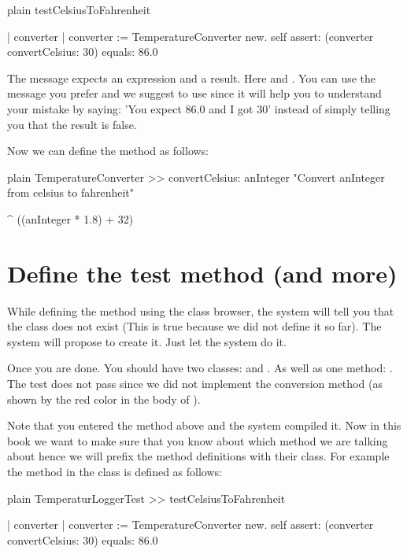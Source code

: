 \documentclass[10pt,twoside,english]{_support/latex/sbabook/sbabook}
\begin{document}
\begin{displaycode}{plain}
testCelsiusToFahrenheit

    | converter |
    converter := TemperatureConverter new.
    self assert: (converter convertCelsius: 30) equals: 86.0
\end{displaycode}

The message  expects an expression and a result. Here  and . You can use the message you prefer and we suggest to use  since it will help you to understand your mistake by saying: 'You expect 86.0 and I got 30' instead of simply telling you that the result is false.

Now we can define the method  as follows:

\begin{displaycode}{plain}
TemperatureConverter >> convertCelsius: anInteger
    "Convert anInteger from celsius to fahrenheit"

    ^ ((anInteger * 1.8) + 32)
\end{displaycode}
\section{Define the test method (and more)}
While defining the method  using the class browser, the system will tell you that the class  does not exist (This is true because we did not define it so far). The system will propose to create it. Just let the system do it.

Once you are done. You should have two classes:  and . As well as one method: . The test does not pass since we did not implement the conversion method (as shown by the red color in the body of ).

Note that you entered the method above and the system compiled it. Now in this book we want to make sure that you know about which method we are talking about hence we will prefix the method definitions with their class. For example the method  in the class  is defined as follows:

\begin{displaycode}{plain}
TemperaturLoggerTest >> testCelsiusToFahrenheit

    | converter |
    converter := TemperatureConverter new.
    self assert: (converter convertCelsius: 30) equals: 86.0
\end{displaycode}
\end{document}
